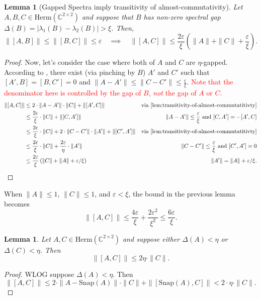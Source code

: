 \documentclass[11pt]{article}
\theoremstyle{plain}
\newtheorem{lemma}[theorem]{Lemma}
\newcommand{\eps}{\varepsilon}
\begin{document}
\begin{lemma}[Gapped Spectra imply transitivity of almost-commutativity]\label{lem:transitivity-almost}
    Let $A,B,C \in \mathrm{Herm}(\mathbb{C}^{2 \times 2})$ and suppose that $B$ has non-zero spectral gap $\Delta(B)=|\lambda_1(B) - \lambda_2(B)| > \xi$. Then, 
$$
\|[A,B]\| \leq \|[B,C]\| \leq \eps \quad \implies \quad \|[A,C]\| \leq \frac{2\eps}{\xi}\left(\|A\| + \|C\| + \frac{\eps}{\xi} \right) .
$$
\end{lemma}
\begin{proof}
Now, let's consider the case where both of $A$ and $C$ are $\eta$-gapped. According to , there exist (via pinching by $B$) $A'$ and $C'$ such that $[A', B] = [B, C'] = 0$ and $\|A - A'\| \leq \|C - C'\| \leq \frac{\eps}{\xi}$. \textcolor{red}{Note that the denominator here is controlled by the gap of $B$, \emph{not} the gap of $A$ or $C$.}
    \begin{align*}
        \|[A,C]\| & \leq 2 \cdot \|A - A'\| \cdot \|C\| + \|[A', C]\| & \text{via \Cref{lem:transitivity-of-almost-commutatitivty}}\\
        &\leq \frac{2\epsilon}{\xi} \cdot \|C\| + \|[C, A']\| & \|A - A'\| \leq \frac{\eps}{\xi} \text{ and } [C,A'] = -[A',C]\\
        &\leq \frac{2\epsilon}{\xi} \cdot \|C\| + 2 \cdot \|C - C'\| \cdot \|A'\| + \|[C',A']\| & \text{via \Cref{lem:transitivity-of-almost-commutatitivty}}\\
        & \leq \frac{2\epsilon}{\xi} \cdot \|C\| + \frac{2\eps}{\eta} \cdot \|A'\| & \|C - C'\| \leq \frac{\eps}{\xi} \text{ and } [C', A'] = 0\\
        & \leq \frac{2\eps}{\xi} \left(\|C\| + \|A\| + \eps/\xi \right) & \|A'\| = \|A\| + \eps/\xi.
    \end{align*}
\end{proof}

\noindent When $\|A\|\leq 1$, $\|C\|\leq 1$, and $\eps < \xi$, the bound in the previous lemma becomes \[\|[A, C]\| \leq \frac{4\eps}{\xi} + \frac{2\eps^2}{\xi^2} \leq \frac{6\eps}{\xi}.\]

\begin{lemma}
    Let $A, C \in \mathrm{Herm}(\mathbb{C}^{2 \times 2})$ and suppose either $\Delta(A) < \eta$ or $\Delta(C) < \eta$. Then
    \[ \| [A, C] \| \leq 2 \eta \cdot \|C\|. \]
\end{lemma}
\begin{proof}
 WLOG suppose $\Delta(A) < \eta$. Then
\[
\|[A,C]\| \leq 2 \cdot \|A - \mathrm{Snap}(A)\| \cdot \|C\| + \|[\mathrm{Snap}(A), C]\| < 2 \cdot \eta \cdot \|C\|. \]
\end{proof}
\end{document}
